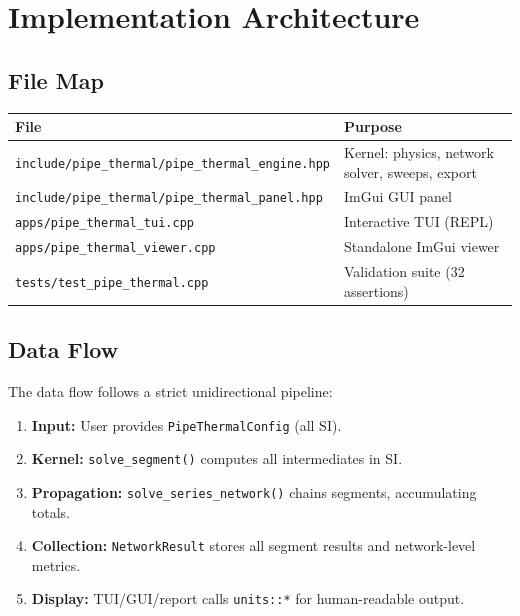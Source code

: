 \documentclass[11pt]{article}
\begin{document}
\section{Implementation Architecture}

\subsection{File Map}

\begin{center}
\begin{tabular}{ll}
\toprule
File & Purpose \\
\midrule
\texttt{include/pipe\_thermal/pipe\_thermal\_engine.hpp} & Kernel: physics, network solver, sweeps, export \\
\texttt{include/pipe\_thermal/pipe\_thermal\_panel.hpp}  & ImGui GUI panel \\
\texttt{apps/pipe\_thermal\_tui.cpp}                     & Interactive TUI (REPL) \\
\texttt{apps/pipe\_thermal\_viewer.cpp}                  & Standalone ImGui viewer \\
\texttt{tests/test\_pipe\_thermal.cpp}                   & Validation suite (32 assertions) \\
\bottomrule
\end{tabular}
\end{center}

\subsection{Data Flow}

The data flow follows a strict unidirectional pipeline:

\begin{enumerate}
  \item \textbf{Input:} User provides \texttt{PipeThermalConfig} (all SI).
  \item \textbf{Kernel:} \texttt{solve\_segment()} computes all intermediates in SI.
  \item \textbf{Propagation:} \texttt{solve\_series\_network()} chains segments,
        accumulating totals.
  \item \textbf{Collection:} \texttt{NetworkResult} stores all segment results
        and network-level metrics.
  \item \textbf{Display:} TUI/GUI/report calls \texttt{units::*} for human-readable output.
\end{enumerate}
\end{document}
